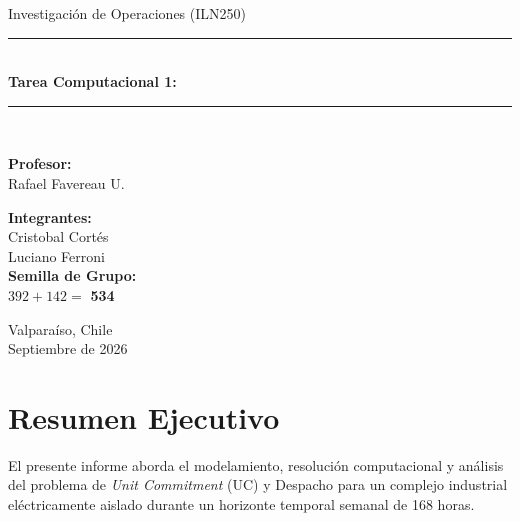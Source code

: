 \documentclass[10pt,letterpaper]{article}
\begin{document}
\begin{titlepage}
    \centering
    \vspace*{0.8cm}
    {\large Investigación de Operaciones (ILN250)\par}
    \vspace{2.0cm}
    
    \rule{\linewidth}{1.2pt} \\[0.4cm]
    {\huge\bfseries\color{usmblue} Tarea Computacional 1: \\[0.25cm]}
    \rule{\linewidth}{1.2pt} \\[2.0cm]
    
    \begin{minipage}[t]{0.48\textwidth}
        \textbf{Profesor:}\\
        Rafael Favereau U.\\
    \end{minipage}
    \hfill
    \begin{minipage}[t]{0.48\textwidth}
        \raggedleft
        \textbf{Integrantes:}\\
        Cristobal Cortés\\
        Luciano Ferroni\\[0.2cm]
        \textbf{Semilla de Grupo:}\\
        $392 + 142 =$ \textbf{534}\\[0.2cm]
    \end{minipage}
    
    \vfill
    {\large Valparaíso, Chile \\ Septiembre de 2026 \par}
\end{titlepage}

\setcounter{page}{1}

\section*{Resumen Ejecutivo}

El presente informe aborda el modelamiento, resolución computacional y análisis del problema de \textit{Unit Commitment} (UC) y Despacho para un complejo industrial eléctricamente aislado durante un horizonte temporal semanal de 168 horas.
\end{document}
